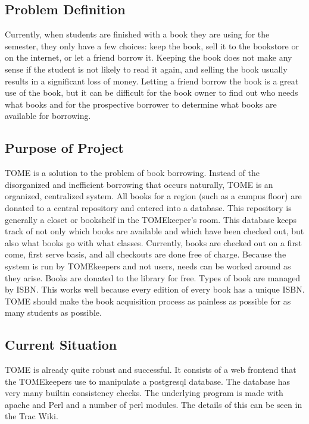\documentclass[12pt,titlepage]{article}
\begin{document}
\subsection{Problem Definition}
Currently, when students are finished with a book they are using for the semester, they only have a few choices: keep the book, sell it to the bookstore or on the internet, or let a friend borrow it.  Keeping the book does not make any sense if the student is not likely to read it again, and selling the book usually results in a significant loss of money.  Letting a friend borrow the book is a great use of the book, but it can be difficult for the book owner to find out who needs what books and for the prospective borrower to determine what books are available for borrowing.
\subsection{Purpose of Project}
TOME is a solution to the problem of book borrowing.  Instead of the disorganized and inefficient borrowing that occurs naturally, TOME is an organized, centralized system.  All books for a region (such as a campus floor) are donated to a central repository and entered into a database.  This repository is generally a closet or bookshelf in the TOMEkeeper's room.  This database keeps track of not only which books are available and which have been checked out, but also what books go with what classes.  Currently, books are checked out on a first come, first serve basis, and all checkouts are done free of charge.  Because the system is run by TOMEkeepers and not users, needs can be worked around as they arise.  Books are donated to the library for free.  Types of book are managed by ISBN.  This works well because every edition of every book has a unique ISBN.  TOME should make the book acquisition process as painless as possible for as many students as possible.
\subsection{Current Situation}
TOME is already quite robust and successful.  It consists of a web frontend that the TOMEkeepers use to manipulate a postgresql database.  The database has very many builtin consistency checks.  The underlying program is made with apache and Perl and a number of perl modules.  The details of this can be seen in the Trac Wiki.
\end{document}
